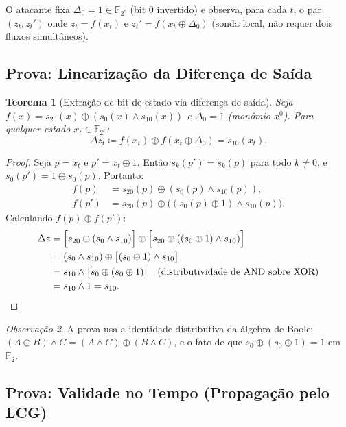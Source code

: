 \documentclass[12pt,a4paper]{article}
\newtheorem{theorem}{Teorema}[section]
\theoremstyle{definition}
\theoremstyle{remark}
\newtheorem{remark}[theorem]{Observação}
\newcommand{\GF}[1]{\mathbb{F}_{2^{#1}}}
\newcommand{\GFtwo}{\mathbb{F}_2}
\newcommand{\xor}{\oplus}
\newcommand{\AND}{\wedge}
\newcommand{\filter}{f}
\newcommand{\ks}{z}
\begin{document}
O atacante fixa $\Delta_0 = 1 \in \GF{e}$ (bit 0 invertido) e observa,
para cada $t$, o par $(z_t, z_t')$ onde $z_t = \filter(x_t)$ e
$z_t' = \filter(x_t \xor \Delta_0)$ (sonda local, não requer dois fluxos
simultâneos).

\subsection{Prova: Linearização da Diferença de Saída}

\begin{theorem}[Extração de bit de estado via diferença de saída]
  \label{thm:delta-z-s10}
  Seja $\filter(x) = s_{20}(x) \xor (s_0(x) \AND s_{10}(x))$ e
  $\Delta_0 = 1$ (monômio $x^0$). Para qualquer estado $x_t \in \GF{e}$:
  \[
    \Delta \ks_t \coloneqq \filter(x_t) \xor \filter(x_t \xor \Delta_0) = s_{10}(x_t).
  \]
\end{theorem}

\begin{proof}
  Seja $p = x_t$ e $p' = x_t \xor 1$. Então $s_k(p') = s_k(p)$ para todo
  $k \neq 0$, e $s_0(p') = 1 \xor s_0(p)$. Portanto:
  \begin{align*}
    \filter(p) &= s_{20}(p) \xor (s_0(p) \AND s_{10}(p)), \\
    \filter(p') &= s_{20}(p) \xor \bigl((s_0(p) \xor 1) \AND s_{10}(p)\bigr).
  \end{align*}
  Calculando $\filter(p) \xor \filter(p')$:
  \begin{align*}
    \Delta\ks &= \Bigl[s_{20} \xor (s_0 \AND s_{10})\Bigr]
               \xor \Bigl[s_{20} \xor ((s_0 \xor 1) \AND s_{10})\Bigr] \\
              &= (s_0 \AND s_{10}) \xor \bigl[(s_0 \xor 1) \AND s_{10}\bigr] \\
              &= s_{10} \AND \bigl[s_0 \xor (s_0 \xor 1)\bigr]
               \quad\text{(distributividade de AND sobre XOR)} \\
              &= s_{10} \AND 1 = s_{10}. \qedhere
  \end{align*}
\end{proof}

\begin{remark}
  A prova usa a identidade distributiva da álgebra de Boole:
  $(A \xor B) \AND C = (A \AND C) \xor (B \AND C)$, e o fato de que
  $s_0 \xor (s_0 \xor 1) = 1$ em $\GFtwo$.
\end{remark}

\subsection{Prova: Validade no Tempo (Propagação pelo LCG)}
\end{document}
